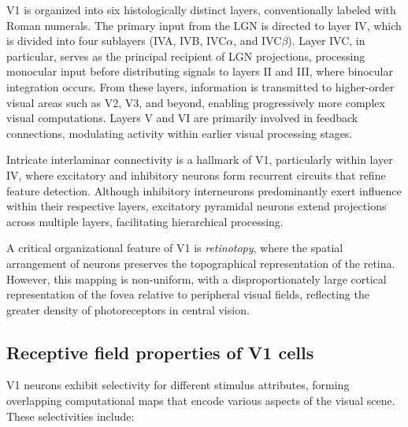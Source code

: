 V1 is organized into six histologically distinct layers, conventionally labeled with
Roman numerals. The primary input from the LGN is directed to layer IV, which is divided into four sublayers (IVA, IVB, IVC$\alpha$, and IVC$\beta$). Layer IVC, 
in particular, serves as the principal recipient of LGN projections, processing
monocular input before distributing signals to layers II and III, where binocular
integration occurs. From these layers, information is transmitted to higher-order 
visual areas such as V2, V3, and beyond, enabling progressively more complex visual
computations. Layers V and VI are primarily involved in feedback connections, 
modulating activity within earlier visual processing stages.

Intricate interlaminar connectivity is a hallmark of V1, particularly within layer IV, 
where excitatory and inhibitory neurons form recurrent circuits that refine feature
detection. Although inhibitory interneurons predominantly exert influence within their
respective layers, excitatory pyramidal neurons extend projections across multiple
layers, facilitating hierarchical processing.

A critical organizational feature of V1 is \emph{retinotopy}, where the spatial
arrangement of neurons preserves the topographical representation of the retina. 
However, this mapping is non-uniform, with a disproportionately large cortical
representation of the fovea relative to peripheral visual fields, reflecting the
greater density of photoreceptors in central vision.

\subsection{Receptive field properties of V1 cells}
\label{subsec:receptive_field}
V1 neurons exhibit selectivity for different stimulus attributes, forming
overlapping computational maps that encode various aspects of the visual scene. 
These selectivities include:


